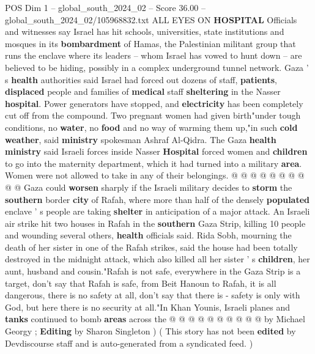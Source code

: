 \begin{textsample}{POS Dim 1 – global\_south\_2024\_02 – Score 36.00 – global\_south\_2024\_02/105968832.txt}
ALL EYES ON \textbf{HOSPITAL} Officials and witnesses say Israel has hit schools, universities, state institutions and mosques in its \textbf{bombardment} of Hamas, the Palestinian militant group that runs the enclave where its leaders -- whom Israel has vowed to hunt down -- are believed to be hiding, possibly in a complex underground tunnel network.
Gaza ' s \textbf{health} authorities said Israel had forced out dozens of staff, \textbf{patients}, \textbf{displaced} people and families of \textbf{medical} staff \textbf{sheltering} in the Nasser \textbf{hospital}.
Power generators have stopped, and \textbf{electricity} has been completely cut off from the compound.
Two pregnant women had given birth"under tough conditions, no \textbf{water}, no \textbf{food} and no way of warming them up,"in such \textbf{cold} \textbf{weather}, said \textbf{ministry} spokesman Ashraf Al-Qidra.
The Gaza \textbf{health} \textbf{ministry} said Israeli forces inside Nasser \textbf{Hospital} forced women and \textbf{children} to go into the maternity department, which it had turned into a military \textbf{area}.
Women were not allowed to take in any of their belongings. @ @ @ @ @ @ @ @ @ @ Gaza could \textbf{worsen} sharply if the Israeli military decides to \textbf{storm} the \textbf{southern} border \textbf{city} of Rafah, where more than half of the densely \textbf{populated} enclave ' s people are taking \textbf{shelter} in anticipation of a major attack.
An Israeli air strike hit two houses in Rafah in the \textbf{southern} Gaza Strip, killing 10 people and wounding several others, \textbf{health} officials said.
Rida Sobh, mourning the death of her sister in one of the Rafah strikes, said the house had been totally destroyed in the midnight attack, which also killed all her sister ' s \textbf{children}, her aunt, husband and cousin."Rafah is not safe, everywhere in the Gaza Strip is a target, don't say that Rafah is safe, from Beit Hanoun to Rafah, it is all dangerous, there is no safety at all, don't say that there is - safety is only with God, but here there is no security at all."In Khan Younis, Israeli planes and \textbf{tanks} continued to bomb \textbf{areas} across the @ @ @ @ @ @ @ @ @ @ by Michael Georgy ; \textbf{Editing} by Sharon Singleton ) ( This story has not been \textbf{edited} by Devdiscourse staff and is auto-generated from a syndicated feed. )

\end{textsample}

